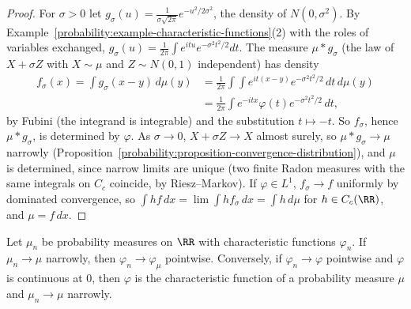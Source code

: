 \begin{proof}
For $\sigma > 0$ let $g_\sigma(u) = \frac{1}{\sigma\sqrt{2\pi}}e^{-u^2/2\sigma^2}$, the density of $N(0, \sigma^2)$. By Example~\ref{probability:example-characteristic-functions}(2) with the roles of variables exchanged,
$g_\sigma(u) = \frac{1}{2\pi}\int e^{itu}e^{-\sigma^2t^2/2}dt$. The measure $\mu * g_\sigma$ (the law of $X + \sigma Z$ with $X \sim \mu$ and $Z \sim N(0, 1)$ independent) has density
\[
\begin{aligned}
f_\sigma(x) = \int g_\sigma(x - y)\,d\mu(y) &= \frac{1}{2\pi}\int\int e^{it(x - y)}e^{-\sigma^2t^2/2}\,dt\,d\mu(y) \\
&= \frac{1}{2\pi}\int e^{-itx}\varphi(t)e^{-\sigma^2t^2/2}\,dt,
\end{aligned}
\]
by Fubini (the integrand is integrable) and the substitution $t \mapsto -t$. So $f_\sigma$, hence $\mu * g_\sigma$, is determined by $\varphi$. As $\sigma \to 0$, $X + \sigma Z \to X$ almost surely, so $\mu * g_\sigma \to \mu$ narrowly
(Proposition~\ref{probability:proposition-convergence-distribution}), and $\mu$ is determined, since narrow limits are unique (two finite Radon measures with the same integrals on $C_c$ coincide, by Riesz--Markov). If
$\varphi \in L^1$, $f_\sigma \to f$ uniformly by dominated convergence, so $\int hf\,dx = \lim\int hf_\sigma\,dx = \int h\,d\mu$ for $h \in C_c(\RR)$, and $\mu = f\,dx$.
\end{proof}

\begin{theorem}\label{probability:theorem-levy-continuity}
Let $\mu_n$ be probability measures on $\RR$ with characteristic functions $\varphi_n$. If $\mu_n \to \mu$ narrowly, then $\varphi_n \to \varphi_\mu$ pointwise. Conversely, if $\varphi_n \to \varphi$ pointwise and $\varphi$ is continuous at $0$,
then $\varphi$ is the characteristic function of a probability measure $\mu$ and $\mu_n \to \mu$ narrowly.
\end{theorem}

